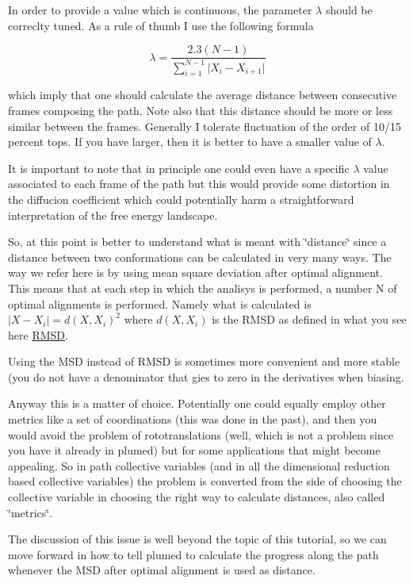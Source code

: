 In order to provide a value which is continuous, the parameter $ \lambda $ should be correclty tuned. As a rule of thumb I use the following formula

\[ \lambda=\frac{2.3 (N-1) }{\sum_{i=1}^{N-1} \vert X_i-X_{i+1} \vert } \]

which imply that one should calculate the average distance between consecutive frames composing the path. Note also that this distance should be more or less similar between the frames. Generally I tolerate fluctuation of the order of 10/15 percent tops. If you have larger, then it is better to have a smaller value of $ \lambda $.

It is important to note that in principle one could even have a specific $ \lambda $ value associated to each frame of the path but this would provide some distortion in the diffucion coefficient which could potentially harm a straightforward interpretation of the free energy landscape.

So, at this point is better to understand what is meant with \char`\"{}distance\char`\"{} since a distance between two conformations can be calculated in very many ways. The way we refer here is by using mean square deviation after optimal alignment. This means that at each step in which the analisys is performed, a number N of optimal alignments is performed. Namely what is calculated is $ \vert X-X_i \vert = d(X,X_i)^2 $ where $ d(X,X_i) $ is the R\+M\+S\+D as defined in what you see here \hyperlink{RMSD}{R\+M\+S\+D}.

Using the M\+S\+D instead of R\+M\+S\+D is sometimes more convenient and more stable (you do not have a denominator that gies to zero in the derivatives when biasing.

Anyway this is a matter of choice. Potentially one could equally employ other metrics like a set of coordinations (this was done in the past), and then you would avoid the problem of rototranslations (well, which is not a problem since you have it already in plumed) but for some applications that might become appealing. So in path collective variables (and in all the dimensional reduction based collective variables) the problem is converted from the side of choosing the collective variable in choosing the right way to calculate distances, also called \char`\"{}metrics\char`\"{}.

The discussion of this issue is well beyond the topic of this tutorial, so we can move forward in how to tell plumed to calculate the progress along the path whenever the M\+S\+D after optimal alignment is used as distance.

